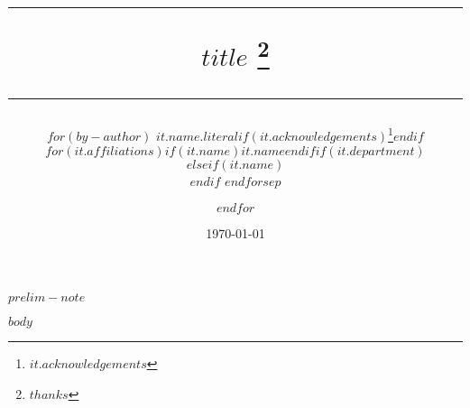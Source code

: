 \documentclass[12pt,a4paper,oneside]{article} %
\begin{document}

\setlength{\droptitle}{-8em}  %
	\title{	\rule{\linewidth}{0.5mm} \textbf{
		{\LARGE $title$ \vspace{-15pt} }}\thanks{\noindent { }$thanks$}  \rule{\linewidth}{0.5mm}  }
\date{\today}

\author{
	$for(by-author)$
	\textbf{$it.name.literal$}$if(it.acknowledgements)$\thanks{ { }$it.acknowledgements$}$endif$\\
	$for(it.affiliations)$$if(it.name)$\small{$it.name$}$endif$$if(it.department)$\\$elseif(it.name)$\vspace{-1.5ex}\\$endif$
	$endfor$$sep$\and$endfor$\vspace{10pt}}

\maketitle
\thispagestyle{empty}

\begin{center}
\vspace{-25pt}	\noindent \textit{$prelim-note$}
\end{center}

\begin{abstract}
	\vspace{-15pt}	
\end{abstract}
\thispagestyle{empty}

\clearpage
\setcounter{page}{1}
\clearpage
\newpage{}

$body$
\end{document}
